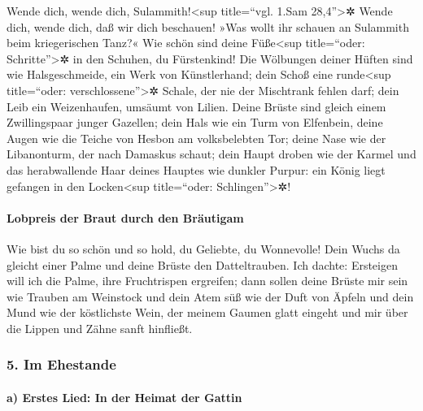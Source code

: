 Wende dich, wende dich, Sulammith!\textless sup
title=``vgl. 1.Sam 28,4''\textgreater✲ Wende dich, wende dich, daß wir
dich beschauen! »Was wollt ihr schauen an Sulammith beim kriegerischen
Tanz?« Wie schön sind deine Füße\textless sup
title=``oder: Schritte''\textgreater✲ in den Schuhen, du Fürstenkind!
Die Wölbungen deiner Hüften sind wie Halsgeschmeide, ein Werk von
Künstlerhand; dein Schoß eine runde\textless sup
title=``oder: verschlossene''\textgreater✲ Schale, der nie der
Mischtrank fehlen darf; dein Leib ein Weizenhaufen, umsäumt von Lilien.
Deine Brüste sind gleich einem Zwillingspaar junger
Gazellen; dein Hals wie ein Turm von Elfenbein, deine
Augen wie die Teiche von Hesbon am volksbelebten Tor; deine Nase wie der
Libanonturm, der nach Damaskus schaut; dein Haupt droben
wie der Karmel und das herabwallende Haar deines Hauptes wie dunkler
Purpur: ein König liegt gefangen in den Locken\textless sup
title=``oder: Schlingen''\textgreater✲!

\hypertarget{lobpreis-der-braut-durch-den-bruxe4utigam}{%
\paragraph{Lobpreis der Braut durch den
Bräutigam}\label{lobpreis-der-braut-durch-den-bruxe4utigam}}

Wie bist du so schön und so hold, du Geliebte, du
Wonnevolle! Dein Wuchs da gleicht einer Palme und deine
Brüste den Datteltrauben. Ich dachte: Ersteigen will ich
die Palme, ihre Fruchtrispen ergreifen; dann sollen deine Brüste mir
sein wie Trauben am Weinstock und dein Atem süß wie der Duft von Äpfeln
und dein Mund wie der köstlichste Wein, der meinem Gaumen
glatt eingeht und mir über die Lippen und Zähne sanft hinfließt.

\hypertarget{im-ehestande}{%
\subsubsection{5. Im Ehestande}\label{im-ehestande}}

\hypertarget{a-erstes-lied-in-der-heimat-der-gattin}{%
\paragraph{a) Erstes Lied: In der Heimat der
Gattin}\label{a-erstes-lied-in-der-heimat-der-gattin}}

